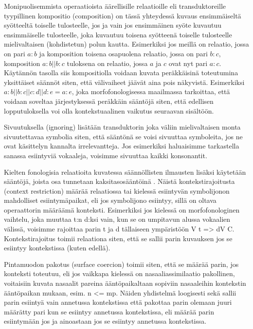 \documentclass[free]{flammie}
\begin{document}
Monipuolisemmista operaatioista äärellisille relaatioille eli transduktoreille tyypillinen kompositio (composition) on tässä yhteydessä kuvaus ensimmäiseltä syötteeltä toiselle tulosteelle, jos ja vain jos ensimmäinen syöte kuvautuu ensimmäiselle tulosteelle, joka kuvautuu toisena syötteenä toiselle tulosteelle mielivaltaisen (kohdistetun) polun kautta. Esimerkiksi jos meillä on relaatio, jossa on pari
$a : b$ ja komposition toisena osapuolena relaatio, jossa on pari $b : c$,
komposition $a : b || b : c$ tuloksena on relaatio, jossa $a$ ja $c$ ovat nyt
pari $a : c$. Käytännön tasolla siis kompositiolla voidaan kuvata peräkkäisinä toteutumina yksittäiset säännöt siten, että välivaiheet jäävät aina pois näkyvistä. Esimerkiksi
$a : b || b : c || c : d || d : e = a : e$, joka morfofonologisessa maailmassa tarkoittaa, että voidaan soveltaa järjestyksessä peräkkäin sääntöjä siten, että edellisen lopputuloksella voi olla kontekstuaalinen vaikutus seuraavan sisältöön.

Sivuutuksella (ignoring) lisätään transduktorin joka väliin mielivaltaisen monta sivuutettavaa symbolia siten, että sääntönä se voisi sivuuttaa symboleita, jos ne ovat
käsittelyn kannalta irrelevantteja. Jos esimerkiksi haluaisimme tarkastella sanassa
esiintyviä vokaaleja, voisimme sivuuttaa kaikki konsonantit.

Kielten fonologisia relaatioita kuvatessa säännöllisten ilmausten lisäksi käytetään
sääntöjä, joista osa tunnetaan kaksitasosääntöinä \cite{koskenniemi1983twolevel}. Näistä
kontekstirajoitusta (context restriction) määrää relaatiossa tai kielessä esiintyvän
symbolijonon mahdolliset esiintymäpaikat, eli jos symbolijono esiintyy, sillä on
oltava operaattorin määräämä konteksti. Esimerkiksi jos kielessä on morfofonologinen vaihtelu, joka muuttaa t:n d:ksi vain, kun se on umpitavun alussa vokaalien
välissä, voisimme rajoittaa parin t ja d tällaiseen ympäristöön V t => dV C. Kontekstirajoitus toimii relaationa siten, että se sallii parin kuvauksen jos se esiintyy
kontekstissa (kuten edellä).

Pintamuodon pakotus (surface coercion) toimii siten, että se määrää parin, jos
konteksti toteutuu, eli jos vaikkapa kielessä on nasaaliassimilaatio pakollinen, voitaisiin kuvata nasaalit pareina ääntöpaikaltaan sopiviin nasaaleihin kontekstin ääntöpaikan mukaan, esim. n <= mp. Näiden yhdistelmä loogisesti sekä sallii parin
esiintyä vain annetussa kontekstissa että pakottaa parin olemaan juuri määrätty
pari kun se esiintyy annetussa kontekstissa, eli määrää parin esiintymään jos ja
ainoastaan jos se esiintyy annetussa kontekstissa.
\end{document}

